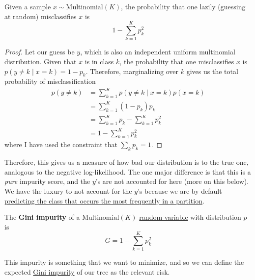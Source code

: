   \begin{lemma}
    \label{thm:probability-of-lazy-misclassification}
    Given a sample $x \sim \mathrm{Multinomial}(K)$, the probability that one lazily (guessing at random) misclassifies $x$ is 
    \begin{equation}
      1 - \sum_{k=1}^K p_k^2
    \end{equation}
  \end{lemma}
  \begin{proof}
    Let our guess be $y$, which is also an independent uniform multinomial distribution. Given that $x$ is in class $k$, the probability that one misclassifies $x$ is $p(y \neq k \mid x = k) = 1 - p_k$. Therefore, marginalizing over $k$ gives us the total probability of misclassification 
    \begin{align}
      p(y \neq k) & = \sum_{k=1}^K p(y \neq k \mid x = k) p(x = k) \\ 
                  & = \sum_{k=1}^K (1 - p_k) p_k \\ 
                  & = \sum_{k=1}^K p_k - \sum_{k=1}^K p_k^2 \\ 
                  & = 1 - \sum_{k=1}^K p_k^2
    \end{align}
    where I have used the constraint that $\sum_k p_k = 1$. 
  \end{proof}

  Therefore, this gives us a measure of how bad our distribution is to the true one, analogous to the negative log-likelihood. The one major difference is that this is a \textit{pure} impurity score, and the $y$'s are not accounted for here (more on this below). We have the luxury to not account for the $y$'s because we are by default \hyperlink{frequent}{predicting the class that occurs the most frequently in a partition}. 

  \begin{definition}
    \label{def:gini-impurity}
    The \textbf{Gini impurity} of a $\mathrm{Multinomial}(K)$ \hyperref[prob-def:random-variable]{random variable} with distribution $p$ is 
    \begin{equation}
      G = 1 - \sum_{k=1}^K p_k^2
    \end{equation}
  \end{definition}

  This impurity is something that we want to minimize, and so we can define the expected \hyperref[def:gini-impurity]{Gini impurity} of our tree as the relevant risk. 

